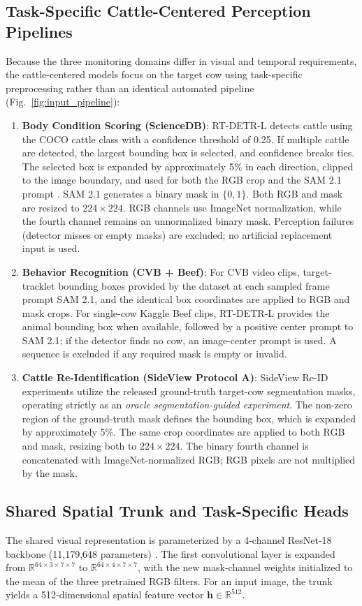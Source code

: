 \documentclass[conference]{IEEEtran}
\begin{document}
\subsection{Task-Specific Cattle-Centered Perception Pipelines}
Because the three monitoring domains differ in visual and temporal requirements, the cattle-centered models focus on the target cow using task-specific preprocessing rather than an identical automated pipeline (Fig.~\ref{fig:input_pipeline}):
\begin{enumerate}
    \item \textbf{Body Condition Scoring (ScienceDB)}: RT-DETR-L \cite{zhao2024rtdetr} detects cattle using the COCO cattle class with a confidence threshold of 0.25. If multiple cattle are detected, the largest bounding box is selected, and confidence breaks ties. The selected box is expanded by approximately 5\% in each direction, clipped to the image boundary, and used for both the RGB crop and the SAM 2.1 prompt \cite{ravi2024sam2}. SAM 2.1 generates a binary mask in $\{0, 1\}$. Both RGB and mask are resized to $224 \times 224$. RGB channels use ImageNet normalization, while the fourth channel remains an unnormalized binary mask. Perception failures (detector misses or empty masks) are excluded; no artificial replacement input is used.
    \item \textbf{Behavior Recognition (CVB + Beef)}: For CVB video clips, target-tracklet bounding boxes provided by the dataset at each sampled frame prompt SAM 2.1, and the identical box coordinates are applied to RGB and mask crops. For single-cow Kaggle Beef clips, RT-DETR-L provides the animal bounding box when available, followed by a positive center prompt to SAM 2.1; if the detector finds no cow, an image-center prompt is used. A sequence is excluded if any required mask is empty or invalid.
    \item \textbf{Cattle Re-Identification (SideView Protocol A)}: SideView Re-ID experiments utilize the released ground-truth target-cow segmentation masks, operating strictly as an \textit{oracle segmentation-guided experiment}. The non-zero region of the ground-truth mask defines the bounding box, which is expanded by approximately 5\%. The same crop coordinates are applied to both RGB and mask, resizing both to $224 \times 224$. The binary fourth channel is concatenated with ImageNet-normalized RGB; RGB pixels are not multiplied by the mask.
\end{enumerate}

\subsection{Shared Spatial Trunk and Task-Specific Heads}
The shared visual representation is parameterized by a 4-channel ResNet-18 backbone (11,179,648 parameters) \cite{he2016resnet}. The first convolutional layer is expanded from $\mathbb{R}^{64 \times 3 \times 7 \times 7}$ to $\mathbb{R}^{64 \times 4 \times 7 \times 7}$, with the new mask-channel weights initialized to the mean of the three pretrained RGB filters. For an input image, the trunk yields a 512-dimensional spatial feature vector $\mathbf{h} \in \mathbb{R}^{512}$.
\end{document}
